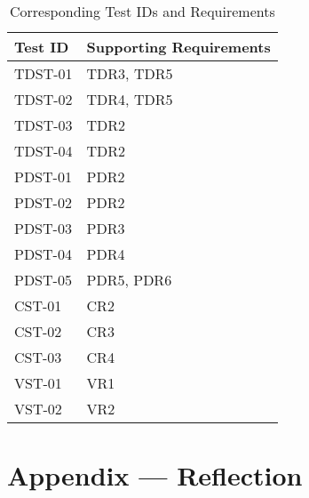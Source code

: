 \documentclass[12pt, titlepage]{article}
\begin{document}
  
\begin{longtable}{ |p{4cm}|p{8cm}|  }
  \caption{Corresponding Test IDs and Requirements}
  \label{tab:Table1}\\
  
  \hline
  \textbf{Test ID} & \textbf{Supporting Requirements}\\
  \hline
  TDST-01 &  TDR3, TDR5\\
  \hline
  TDST-02 &  TDR4, TDR5 \\
  \hline
  TDST-03 &  TDR2 \\
  \hline
  TDST-04 &  TDR2 \\
  \hline
  PDST-01 &  PDR2 \\
  \hline
  PDST-02 &  PDR2 \\
  \hline
  PDST-03 &  PDR3 \\
  \hline
  PDST-04 &  PDR4 \\
  \hline
  PDST-05 &  PDR5, PDR6 \\
  \hline
  CST-01 &  CR2 \\
  \hline
  CST-02 &  CR3 \\
  \hline
  CST-03 &  CR4 \\
  \hline
  VST-01 &  VR1 \\
  \hline
  VST-02&  VR2 \\
  \hline
\end{longtable}

\newpage








\newpage{}
\section*{Appendix --- Reflection}
\end{document}
